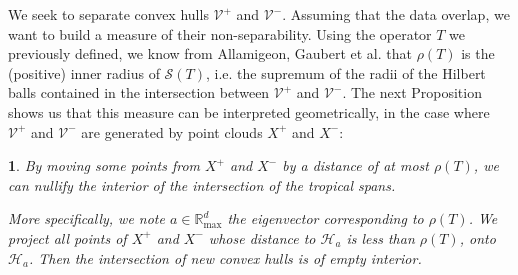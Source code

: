 \documentclass[oneside,english,a4paper]{amsart}
\numberwithin{equation}{section}
\numberwithin{figure}{section}
\theoremstyle{plain}
\theoremstyle{definition}
\theoremstyle{plain}
\newtheorem{prop}[thm]{\protect\propositionname}
\theoremstyle{remark}
\theoremstyle{plain}
\theoremstyle{definition}
\theoremstyle{definition}
\providecommand{\propositionname}{Proposition}
\begin{document}
We seek to separate convex hulls $\mathcal{V}^{+}$ and $\mathcal{V}^{-}$.
Assuming that the data overlap, we want to build a measure of their
non-separability. Using the operator $T$ we previously defined, we
know from Allamigeon, Gaubert et al. \cite{Allamigeon2018} that $\rho(T)$ is the
(positive) inner radius of $\mathcal{S}(T)$, i.e. the supremum of
the radii of the Hilbert balls contained in the intersection between
$\mathcal{V}^{+}$ and $\mathcal{V}^{-}$. The next Proposition shows
us that this measure can be interpreted geometrically, in the case
where $\mathcal{V}^{+}$ and $\mathcal{V}^{-}$ are generated by point
clouds $X^{+}$ and $X^{-}$:
\begin{prop}
By moving some points from $X^{+}$ and $X^{-}$ by a distance of
at most $\rho(T)$, we can nullify the interior of the intersection
of the tropical spans.

More specifically, we note $a\in\mathbb{R}_{\max}^{d}$ the eigenvector
corresponding to $\rho(T)$. We project all points of $X^{+}$ and
$X^{-}$ whose distance to $\mathcal{H}_{a}$ is less than $\rho(T)$,
onto $\mathcal{H}_{a}$. Then the intersection of new convex hulls
is of empty interior.
\end{prop}
\end{document}
